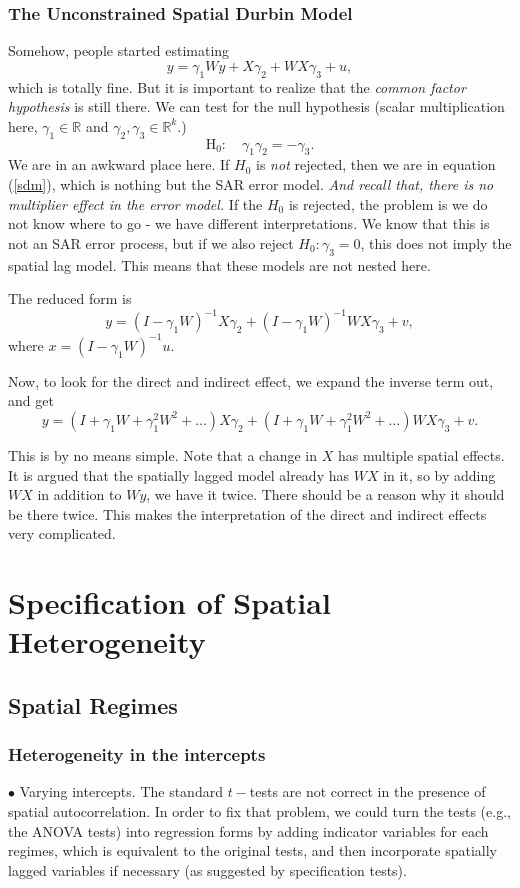 \documentclass[11pt,a4paper]{amsart}
\theoremstyle{plain}
\theoremstyle{definition}
\begin{document}
\subsubsection{The Unconstrained Spatial Durbin Model}\hfill\par 
Somehow, people started estimating
\[	y = \gamma_{1}Wy + X\gamma_{2} + WX\gamma_{3} + u,	\]
which is totally fine. But it is important to realize that the \textit{common factor hypothesis} is still there. We can test for the null hypothesis (scalar multiplication here, $\gamma_{1} \in \mathbb{R}$ and $\gamma_{2}, \gamma_{3} \in \mathbb{R}^{k}$.)
\[	\operatorname{H_{0}}:\quad \gamma_{1} \gamma_{2} = -\gamma_{3}.	\]
We are in an awkward place here. If $H_{0}$ is \textit{not} rejected, then we are in equation (\ref{sdm}), which is nothing but the SAR error model. \emph{And recall that, there is no multiplier effect in the error model.} If the $H_{0}$ is rejected, the problem is we do not know where to go - we have different interpretations. We know that this is not an SAR error process, but if we also reject $H_{0}: \gamma_{3} = 0$, this does not imply the spatial lag model. This means that these models are not nested here. 

The reduced form is 
\[	y = (I-\gamma_{1}W)^{-1}X\gamma_{2} + (I-\gamma_{1}W)^{-1}WX\gamma_{3} + v,	\]
where $x = (I-\gamma_{1}W)^{-1}u$.

Now, to look for the direct and indirect effect, we expand the inverse term out, and get
\[	y = (I + \gamma_{1}W + \gamma_{1}^{2}W^{2} + \dots )X\gamma_{2} + (I+\gamma_{1}W + \gamma_{1}^{2}W^{2} + \dots )WX\gamma_{3} + v.	\]

This is by no means simple. Note that a change in $X$ has multiple spatial effects. It is argued that the spatially lagged model already has $WX$ in it, so by adding $WX$ in addition to $Wy$, we have it twice. There should be a reason why it should be there twice. This makes the interpretation of the direct and indirect effects very complicated. 

\section{Specification of Spatial Heterogeneity}\hfill\par 
\subsection{Spatial Regimes}\hfill\par 
\subsubsection{Heterogeneity in the intercepts}
$\bullet$ Varying intercepts. The standard $t-$tests are not correct in the presence of spatial autocorrelation. In order to fix that problem, we could turn the tests (e.g., the ANOVA tests) into regression forms by adding indicator variables for each regimes, which is equivalent to the original tests, and then incorporate spatially lagged variables if necessary (as suggested by specification tests). 
\end{document}
